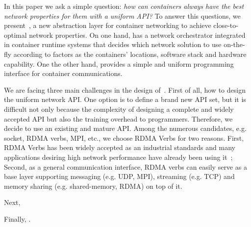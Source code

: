 In this paper we ask a simple question: {\em how can containers always have the best network properties for them with a uniform API?}
To answer this questions, we present~\sysname, a new abstraction layer for container networking to achieve close-to-optimal network properties. 
On one hand, \sysname has a network orchestrator integrated in container runtime systems that decides which network solution to use on-the-fly according to factors as the containers' locations, software stack and hardware capability. One the other hand, \sysname provides a simple and uniform programming interface for container communications.   

We are facing three main challenges in the design of~\sysname. First of all, 
how to design the uniform network API. One option is to define a brand new API 
set, but it is difficult not only because the complexity of designing a complete
and widely accepted API but also the training overhead to programmers.
Therefore, we decide to use an existing and mature API. Among the numerous candidates, e.g. socket, RDMA verbs, MPI, etc., we choose RDMA Verbs for two
reasons. First, RDMA Verbs has been widely accepted as an industrial standards and many applications desiring high network performance have already been using it~\cite{?}; Second, as a general communication interface, RDMA verbs can easily serve as a base layer supporting messaging (e.g. UDP,
MPI), streaming (e.g. TCP) and memory sharing (e.g. shared-memory, RDMA) on top of it.

Next, 

Finally, .